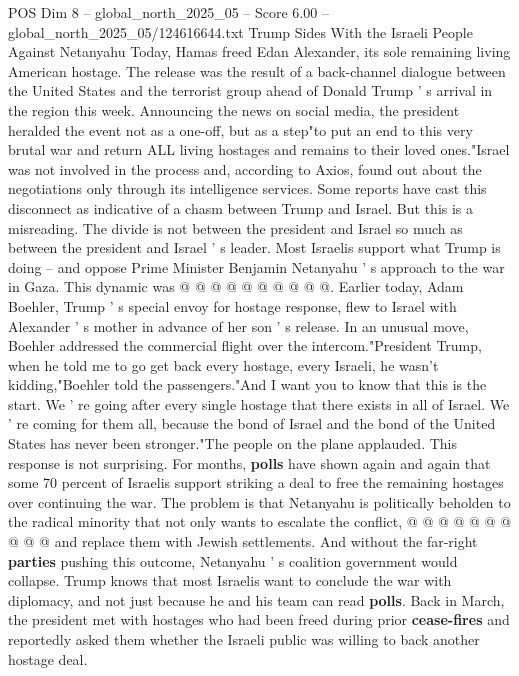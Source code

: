 \begin{textsample}{POS Dim 8 – global\_north\_2025\_05 – Score 6.00 – global\_north\_2025\_05/124616644.txt}  \label{ex:f8_pos_403}
Trump Sides With the Israeli People Against Netanyahu Today, Hamas freed Edan Alexander, its sole remaining living American hostage.
The release was the result of a back-channel dialogue between the United States and the terrorist group ahead of Donald Trump ' s arrival in the region this week.
Announcing the news on social media, the president heralded the event not as a one-off, but as a step"to put an end to this very brutal war and return ALL living hostages and remains to their loved ones."Israel was not involved in the process and, according to Axios, found out about the negotiations only through its intelligence services.
Some reports have cast this disconnect as indicative of a chasm between Trump and Israel.
But this is a misreading.
The divide is not between the president and Israel so much as between the president and Israel ' s leader.
Most Israelis support what Trump is doing -- and oppose Prime Minister Benjamin Netanyahu ' s approach to the war in Gaza.
This dynamic was @ @ @ @ @ @ @ @ @ @.
Earlier today, Adam Boehler, Trump ' s special envoy for hostage response, flew to Israel with Alexander ' s mother in advance of her son ' s release.
In an unusual move, Boehler addressed the commercial flight over the intercom."President Trump, when he told me to go get back every hostage, every Israeli, he wasn't kidding,"Boehler told the passengers."And I want you to know that this is the start.
We ' re going after every single hostage that there exists in all of Israel.
We ' re coming for them all, because the bond of Israel and the bond of the United States has never been stronger."The people on the plane applauded.
This response is not surprising.
For months, \textbf{polls} have shown again and again that some 70 percent of Israelis support striking a deal to free the remaining hostages over continuing the war.
The problem is that Netanyahu is politically beholden to the radical minority that not only wants to escalate the conflict, @ @ @ @ @ @ @ @ @ @ and replace them with Jewish settlements.
And without the far-right \textbf{parties} pushing this outcome, Netanyahu ' s coalition government would collapse.
Trump knows that most Israelis want to conclude the war with diplomacy, and not just because he and his team can read \textbf{polls}.
Back in March, the president met with hostages who had been freed during prior \textbf{cease-fires} and reportedly asked them whether the Israeli public was willing to back another hostage deal.

\end{textsample}

